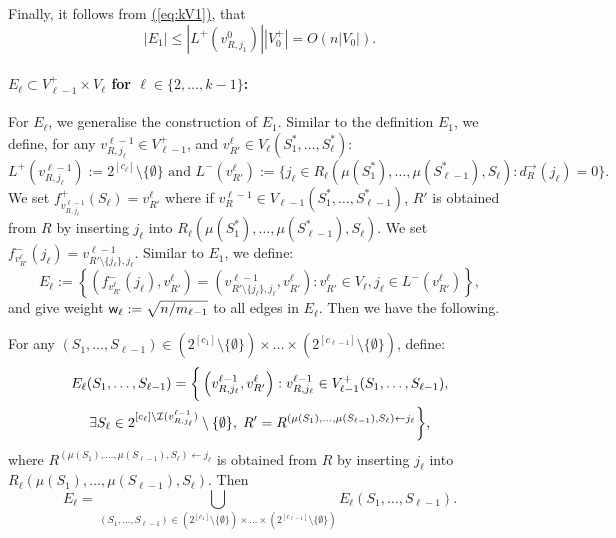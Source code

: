 \documentclass{article}
\newcommand{\eq}[1]{\hyperref[eq:#1]{(\ref*{eq:#1})}}
\renewcommand{\>}{\rangle}
\newcommand{\<}{\langle}
\renewcommand{\(}{\left(}
\renewcommand{\)}{\right)}
\def\abs#1{\left| #1 \right|}
\def\w{{\sf w}}
\begin{document}
Finally, it follows from \eq{kV1}, that 
\begin{equation}
	\abs{E_1} \leq \abs{L^+(v^0_{R,j_1})}\abs{V_0^+} = O\left(n\abs{V_0}\right).\label{eq:kE2}
\end{equation}


\paragraph{$E_{\ell}\subset V_{\ell-1}^+\times V_{\ell}$ for $\ell\in\{2,\dots,k-1\}$:} For $E_{\ell}$, we generalise the construction of $E_1$. Similar to the definition $E_1$, we define, for any $v^{\ell-1}_{R,j_{\ell}}\in V_{\ell-1}^+$, and $v_{R'}^{\ell}\in V_{\ell}(S_1^*,\dots,S_{\ell}^*)$:
$$L^+(v^{\ell-1}_{R,j_{\ell}}):=2^{[c_{\ell}]}\setminus\{\emptyset\}
\mbox{ and }
L^-(v^{\ell}_{R'}):=\{j_{\ell}\in R_{\ell}(\mu(S_1^*),\dots,\mu(S_{\ell-1}^*),S_{\ell}): d_R^{\rightarrow}(j_{\ell})=0\}.$$
We set $f^+_{v^{\ell-1}_{R,j_{\ell}}}(S_{\ell})=v^{\ell}_{R'}$ where if $v^{\ell-1}_R\in V_{\ell-1}(S_1^*,\dots,S_{\ell-1}^*)$, $R'$ is obtained from $R$ by inserting $j_{\ell}$ into $R_{\ell}(\mu(S_1^*),\dots,\mu(S_{\ell-1}^*),S_{\ell})$. We set $f^-_{v^{\ell}_{R'}}(j_{\ell})=v_{R'\setminus\{j_{\ell}\},j_{\ell}}^{\ell-1}$. Similar to $E_1$, we define:
\begin{equation}
{E}_{\ell}:=\left\{\left(f^-_{v^{\ell}_{R'}}(j_{\ell}), v^{\ell}_{R'}\right)=\left(v^{\ell-1}_{R'\setminus\{j_{\ell}\},j_{\ell}},v^{\ell}_{R'}\right): v^{\ell}_{R'}\in V_{\ell}, j_{\ell}\in L^-(v^{\ell}_{R'})\right\},\label{eq:k-dist-E_ell}
\end{equation}
and give weight $\w_{\ell}:=\sqrt{n/m_{\ell-1}}$ to all edges in ${E}_{\ell}$. Then we have the following.
\begin{lemma}\label{lem:k-dist-E-ell}
For any $(S_1,\dots,S_{\ell-1})\in (2^{[c_1]}\setminus\{\emptyset\})\times\dots\times(2^{[c_{\ell-1}]}\setminus\{\emptyset\})$, define:
\begin{multline*}
	{E}_{\ell}(S_1,\dots,S_{\ell-1})=\bigg\{\left(v^{\ell-1}_{R,j_{\ell}},v^{\ell}_{R'}\right): v^{\ell-1}_{R,j_{\ell}}\in V_{\ell-1}^+(S_1,\dots,S_{\ell-1}),\\
	 \exists S_{\ell} \in 2^{[c_{\ell}]\setminus {\cal I}(v^{\ell-1}_{R,j_{\ell}})} \setminus \{\emptyset\},\;
R'=R^{(\mu(S_1),\dots,\mu(S_{\ell-1}),S_{\ell})\leftarrow j_{\ell}} \bigg\},
\end{multline*}
where $R^{(\mu(S_1),\dots,\mu(S_{\ell-1}),S_{\ell})\leftarrow j_{\ell}}$ is obtained from $R$ by inserting $j_{\ell}$ into $R_{\ell}(\mu(S_1),\dots,\mu(S_{\ell-1}),S_{\ell})$. Then
$${E}_{\ell} = \bigcup_{(S_1,\dots,S_{\ell-1})\in (2^{[c_1]}\setminus\{\emptyset\})\times\dots\times(2^{[c_{\ell-1}]}\setminus\{\emptyset\})} {E}_{\ell}(S_1,\dots,S_{\ell-1}).$$
\end{lemma}
\end{document}
